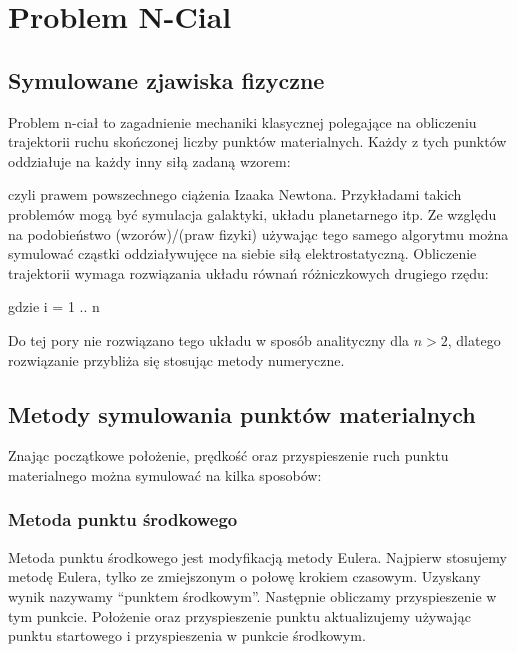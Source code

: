 
\section { Problem N-Cial }
\subsection {Symulowane zjawiska fizyczne}
Problem n-ciał to zagadnienie mechaniki klasycznej polegające na obliczeniu trajektorii ruchu skończonej liczby punktów materialnych. 
Każdy z tych punktów oddziałuje na każdy inny siłą zadaną wzorem:

\begin{center}
 
\end{center}

czyli prawem powszechnego ciążenia Izaaka Newtona.\linebreak
Przykładami takich problemów mogą być symulacja galaktyki, układu planetarnego itp.
Ze względu na podobieństwo (wzorów)/(praw fizyki) używając tego samego algorytmu można symulować cząstki oddziaływujęce na siebie siłą elektrostatyczną.\linebreak
Obliczenie trajektorii wymaga rozwiązania układu równań różniczkowych drugiego rzędu:
\begin{center}
 gdzie i = 1 .. n 
\end{center}


Do tej pory nie rozwiązano tego układu w sposób analityczny dla $n > 2$, dlatego rozwiązanie przybliża się stosując metody numeryczne.

\subsection {Metody symulowania punktów materialnych}

Znając początkowe położenie, prędkość oraz przyspieszenie ruch punktu materialnego można symulować na kilka sposobów:


\subsubsection {Metoda punktu środkowego}
Metoda punktu środkowego jest modyfikacją metody Eulera. Najpierw stosujemy metodę Eulera, tylko ze zmiejszonym o połowę krokiem czasowym. Uzyskany wynik nazywamy ``punktem środkowym''. Następnie obliczamy przyspieszenie w tym punkcie. Położenie oraz przyspieszenie punktu aktualizujemy używając punktu startowego i przyspieszenia w punkcie środkowym.

